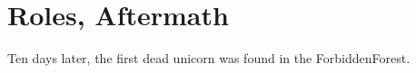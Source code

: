 \chapter{Roles, Aftermath}

Ten days later, the first dead unicorn was found in the ForbiddenForest.
